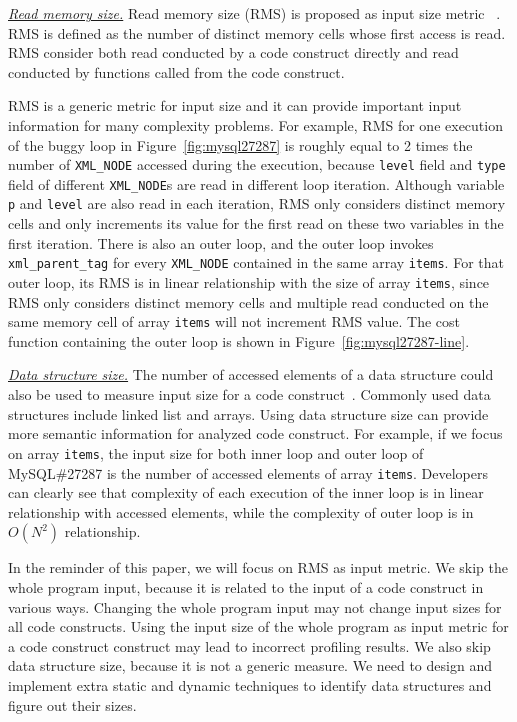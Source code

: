 \underline{\textit{Read memory size.}}
Read memory size (RMS) is proposed as input size metric~\cite{Aprof1,Aprof2} . 
RMS is defined as the number of distinct memory cells 
whose first access is read. 
RMS consider both read conducted by a code construct directly 
and read conducted by 
functions called from the code construct. 

RMS is a generic metric for input size 
and it can provide important input information for many complexity problems.   
For example, 
RMS for one execution of
the buggy loop in Figure~\ref{fig:mysql27287}
is roughly equal to 2 times the number of \texttt{XML\_NODE} 
accessed during the execution, 
because \texttt{level} field and \texttt{type} field of 
different \texttt{XML\_NODE}s are read in different loop iteration.
Although variable \texttt{p} and \texttt{level} are also read in each iteration,
RMS only considers distinct memory cells and 
only increments its value for the first read on these two variables in the first iteration. 
There is also an outer loop, 
and the outer loop invokes \texttt{xml\_parent\_tag} 
for every \texttt{XML\_NODE} contained
in the same array \texttt{items}. 
For that outer loop, its RMS is in linear relationship 
with the size of array \texttt{items}, 
since RMS only considers distinct memory cells 
and multiple read conducted on the same memory 
cell of array \texttt{items} will not increment RMS value. 
The cost function containing the outer loop is shown 
in Figure~\ref{fig:mysql27287-line}.

{\underline{\textit{Data structure size.}}}
The number of accessed elements of a data 
structure could also be used to measure 
input size for a code construct~\cite{AlgoProf}. 
Commonly used data structures include linked list and arrays.
Using data structure size can provide more semantic information for 
analyzed code construct.
For example, if we focus on array \texttt{items}, 
the input size for both 
inner loop and outer loop of MySQL\#27287 is 
the number of accessed elements of array \texttt{items}.
Developers can clearly see that complexity of each execution 
of the inner loop is in linear relationship with accessed elements, 
while the complexity of outer loop is in $O(N^2)$ relationship. 

In the reminder of this paper, we will focus on RMS as input metric. 
We skip the whole program input, 
because it is related to the input of a code construct in various ways.
Changing the whole program input may not change input sizes for 
all code constructs. 
Using the input size of the whole program as input metric for a code construct
construct may lead to incorrect profiling results. 
We also skip data structure size,
because it is not a generic measure. 
We need to design and implement extra static and dynamic techniques 
to identify data structures and figure out their sizes.

